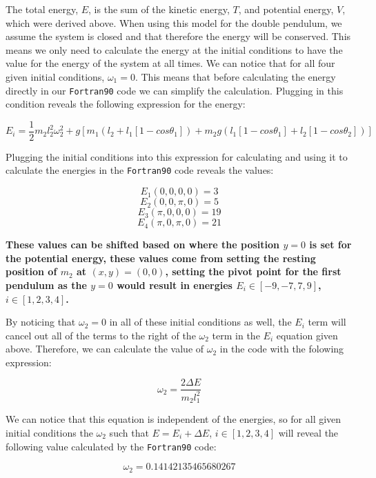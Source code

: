\documentclass[12pt]{article}
\begin{document}
The total energy, $E$, is the sum of the kinetic energy, $T$, and potential energy, $V$, which were derived above.  When using this model for the double pendulum, we assume the system is closed and that therefore the energy will be conserved.  This means we only need to calculate the energy at the initial conditions to have the value for the energy of the system at all times.  We can notice that for all four given initial conditions, $\omega_1 = 0$.  This means that before calculating the energy directly in our {\tt Fortran90} code we can simplify the calculation.  Plugging in this condition reveals the following expression for the energy:

\[E_i = \frac{1}{2} m_2 l_2^2 \omega_2^2 + g[m_1(l_2+l_1[1-cos\theta_1])+m_2 g(l_1[1-cos\theta_1]+l_2[1-cos\theta_2])]\]

Plugging the initial conditions into this expression for calculating and using it to calculate the energies in the {\tt Fortran90} code reveals the values:

\[E_1(0,0,0,0)=3\]
\[E_2(0,0,\pi,0)=5\]
\[E_3(\pi,0,0,0)=19\]
\[E_4(\pi,0,\pi,0)=21\]

\textbf{These values can be shifted based on where the position $y=0$ is set for the potential energy, these values come from setting the resting position of $m_2$ at $(x,y)=(0,0)$, setting the pivot point for the first pendulum as the $y=0$ would result in energies $E_i \in [-9, -7, 7, 9]$, $i \in [1, 2, 3, 4]$.}

By noticing that $\omega_2=0$ in all of these initial conditions as well, the $E_i$ term will cancel out all of the terms to the right of the $\omega_2$ term in the $E_i$ equation given above.  Therefore, we can calculate the value of $\omega_2$ in the code with the folowing expression:

\[\omega_2=\frac{2 \Delta E}{m_2 l_1^2}\]

We can notice that this equation is independent of the energies, so for all given initial conditions the $\omega_2$ such that $E=E_i+\Delta E$, $i \in [1,2,3,4]$ will reveal the following value calculated by the {\tt Fortran90} code:

\[\omega_2=0.14142135465680267\]
\end{document}
